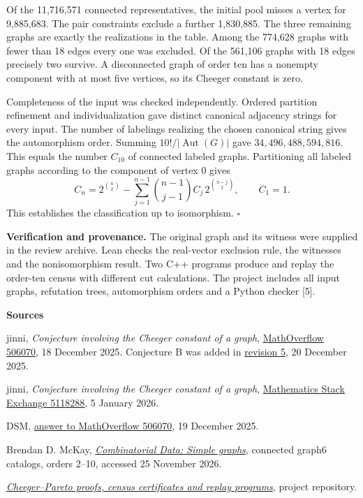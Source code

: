 \documentclass[11pt,a4paper]{article}
\begin{document}
Of the 11,716,571 connected representatives, the initial pool misses
a vertex for 9,885,683. The pair constraints exclude a further
1,830,885. The three remaining graphs are exactly the realizations
in the table. Among the 774,628 graphs with fewer than 18 edges every
one was excluded. Of the 561,106 graphs with 18 edges precisely two
survive. A disconnected graph of order ten has a nonempty component
with at most five vertices, so its Cheeger constant is zero.

Completeness of the input was checked independently. Ordered partition
refinement and individualization gave distinct canonical adjacency
strings for every input. The number of labelings realizing the chosen
canonical string gives the automorphism order. Summing
\(10!/|\operatorname{Aut}(G)|\) gave \(34{,}496{,}488{,}594{,}816\).
This equals the number \(C_{10}\) of connected labeled graphs. Partitioning
all labeled graphs according to the component of vertex 0 gives
\[
C_n=2^{\binom n2}-
  \sum_{j=1}^{n-1}\binom{n-1}{j-1} C_j\,2^{\binom{n-j}{2}},
\qquad C_1=1.
\]
This establishes the classification up to isomorphism. \hfill\(\square\)

{\small\textbf{Verification and provenance.}
The original graph and its witness were supplied in the review archive.
Lean checks the real-vector exclusion rule, the witnesses and the
nonisomorphism result. Two C++ programs produce and replay the order-ten
census with different cut calculations. The project includes all input
graphs, refutation trees, automorphism orders and a Python checker [5].}

{\small
\textbf{Sources}\par
[1] jinni, \emph{Conjecture involving the Cheeger constant of a graph},
\href{https://mathoverflow.net/questions/506070}{MathOverflow 506070},
18 December 2025. Conjecture B was added in
\href{https://mathoverflow.net/revisions/c774f5bd-ab71-4085-8a45-7df5d7b6ddec/view-source}{revision 5},
20 December 2025.\par
[2] jinni, \emph{Conjecture involving the Cheeger constant of a graph},
\href{https://math.stackexchange.com/questions/5118288}{Mathematics Stack Exchange 5118288},
5 January 2026.\par
[3] DSM, \href{https://mathoverflow.net/a/506124}{answer to MathOverflow 506070},
19 December 2025.\par
[4] Brendan D. McKay, \href{https://users.cecs.anu.edu.au/~bdm/data/graphs.html}{\emph{Combinatorial Data: Simple graphs}},
connected graph6 catalogs, orders 2--10, accessed 25 November 2026.\par
[5] \href{https://github.com/Kazeshima/solved-problems/tree/main/problems/cheeger-pareto}{\emph{Cheeger--Pareto proofs, census certificates and replay programs}}, project repository.}
\end{document}
